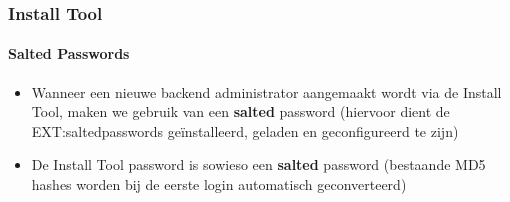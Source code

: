 \begin{frame}[fragile]
\begin{columns}[T]
\begin{column}{.7\textwidth}
\begin{figure}
			\end{figure}
		\end{column}
	\end{columns}
\end{frame}


\begin{frame}[fragile]
	\frametitle{Install Tool}
	\framesubtitle{Salted Passwords}

	\begin{itemize}
		\item Wanneer een nieuwe backend administrator aangemaakt wordt via de Install Tool, \newline
			maken we gebruik van een \textbf{salted} password\newline
			(hiervoor dient de EXT:saltedpasswords geïnstalleerd, geladen en geconfigureerd te zijn)
		\item De Install Tool password is sowieso een \textbf{salted} password\newline
			(bestaande MD5 hashes worden bij de eerste login automatisch geconverteerd)
	\end{itemize}


\end{frame}
